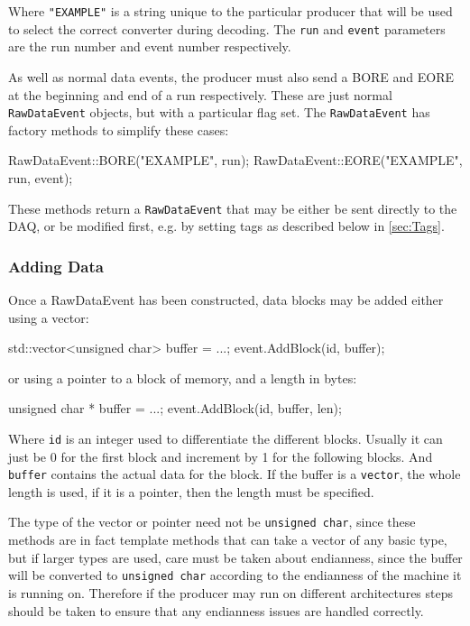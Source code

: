 Where \texttt{"EXAMPLE"} is a string unique to the particular producer
that will be used to select the correct converter during decoding.
The \texttt{run} and \texttt{event} parameters are the run number
and event number respectively.

As well as normal data events, the producer must also send a \gls{BORE}
and \gls{EORE} at the beginning and end of a run respectively.
These are just normal \texttt{RawDataEvent} objects, but with a particular flag set.
The \texttt{RawDataEvent} has factory methods to simplify these cases:
\begin{listing}
RawDataEvent::BORE("EXAMPLE", run);
RawDataEvent::EORE("EXAMPLE", run, event);
\end{listing}

These methods return a \texttt{RawDataEvent} that may be either be sent directly to the DAQ,
or be modified first, e.g. by setting tags as described below in \autoref{sec:Tags}.

\subsubsection{Adding Data}
Once a RawDataEvent has been constructed,
data blocks may be added either using a vector:
\begin{listing}
std::vector<unsigned char> buffer = ...;
event.AddBlock(id, buffer);
\end{listing}

or using a pointer to a block of memory, and a length in bytes:
\begin{listing}
unsigned char * buffer = ...;
event.AddBlock(id, buffer, len);
\end{listing}

Where \texttt{id} is an integer used to differentiate the different blocks.
Usually it can just be 0 for the first block and increment by 1 for the following blocks.
And \texttt{buffer} contains the actual data for the block.
If the buffer is a \texttt{vector}, the whole length is used,
if it is a pointer, then the length must be specified.

The type of the vector or pointer need not be \texttt{unsigned char},
since these methods are in fact template methods that can take a vector of any basic type,
but if larger types are used, care must be taken about endianness,
since the buffer will be converted to \texttt{unsigned char}
according to the endianness of the machine it is running on.
Therefore if the producer may run on different architectures steps should be taken
to ensure that any endianness issues are handled correctly.

